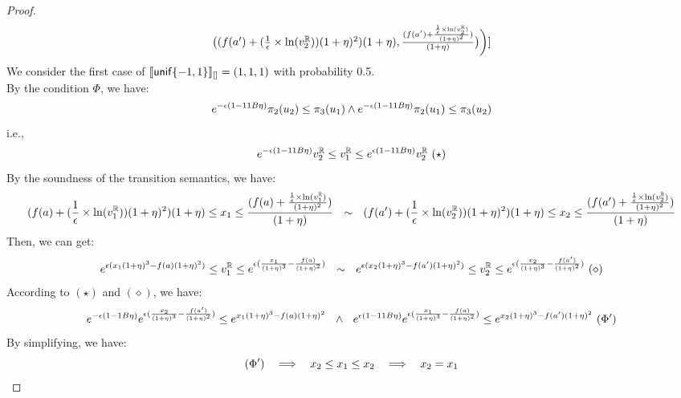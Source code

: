 \documentclass[a4paper,11pt]{article}
\begin{document}
\begin{proof}
\[\begin{array}{ll}
				\big( (f(a') + 
				(\frac{1}{\epsilon} \times \ln(v^{\mathbb{R}}_2))
				(1 + \eta)^2)
				{(1 + \eta)},
				\frac{(
				f(a') + \frac{\frac{1}{\epsilon} 
				\times \ln(v^{\mathbb{R}}_2)}
				{(1 + \eta)^2}
				)}
				{(1 + \eta)}
				 \big)
				\bigg)]	
	\end{array}
\]
We consider the first case of $\llbracket \mathsf{unif}\{-1, 1\} \rrbracket_{[]} = (1, 1, 1)$ with probability 0.5.
\\
By the condition $\Phi$, we have:
\[
	e^{-\epsilon(1 - 11B\eta)} \pi_2(u_2) \leq \pi_3 (u_1) 
	\land 
	e^{-\epsilon(1 - 11B\eta)} \pi_2 (u_1) \leq \pi_3 (u_2)
\]
i.e.,
\[
	e^{-\epsilon(1 - 11B\eta)} \rval_2 \leq \rval_1
	\leq e^{\epsilon(1 - 11B\eta)} \rval_2
	 ~ (\star)
\]
By the soundness of the transition semantics, we have:
\[
	(f(a) + (\frac{1}{\epsilon} \times \ln(v^{\mathbb{R}}_1))
	(1 + \eta)^2){(1 + \eta)}
	\leq x_1 \leq
	\frac{(f(a) + \frac{\frac{1}{\epsilon} 
	\times \ln(v^{\mathbb{R}}_1)}{(1 + \eta)^2})}
	{(1 + \eta)}
	~~ \sim ~~
	(f(a') + (\frac{1}{\epsilon} \times \ln(v^{\mathbb{R}}_2))
	(1 + \eta)^2){(1 + \eta)}
	\leq x_2 \leq
	\frac{(f(a') + \frac{\frac{1}{\epsilon} 
	\times \ln(v^{\mathbb{R}}_2)}
	{(1 + \eta)^2} )}{(1 + \eta)}
\]
Then, we can get:
\[
	e^{\epsilon(x_1 (1 + \eta)^3 - f(a)(1 + \eta)^2)}
	\leq v^{\mathbb{R}}_1 \leq
	e^{\epsilon(\frac{x_1}{(1 + \eta)^3}  - \frac{f(a)}{(1 + \eta)^2})}
	~~ \sim ~~
	e^{\epsilon(x_2 (1 + \eta)^3 - f(a')(1 + \eta)^2)}
	\leq v^{\mathbb{R}}_2 \leq
	e^{\epsilon(\frac{x_2}{(1 + \eta)^3}  - \frac{f(a')}{(1 + \eta)^2})} ~ (\diamond)
\]
According to $(\star)$ and $(\diamond)$, we have:
\[
		e^{-\epsilon(1 - 1B\eta)} 
		e^{\epsilon (\frac{x_2}{(1 + \eta)^3} - \frac{f(a')}{(1 + \eta)^2})}
		\leq 
		e^{x_1(1 + \eta)^3 - f(a)(1 + \eta)^2}
		~~ \land ~~
		e^{\epsilon(1 - 11B\eta)} 
		e^{\epsilon (\frac{x_1}{(1 + \eta)^3} - \frac{f(a)}{(1 + \eta)^2})}
		\leq 
		e^{x_2(1 + \eta)^3 - f(a')(1 + \eta)^2} ~ (\Phi')
\]
By simplifying, we have:
\[
	(\Phi')	
	~~ \implies ~~
	x_2 \leq x_1 \leq x_2 
	~~ \implies ~~
	x_2 = x_1
\]

\end{proof}

\newpage


\end{document}
